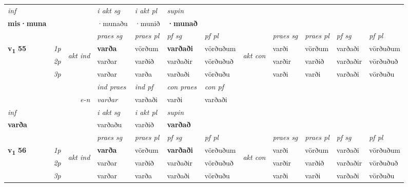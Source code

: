 \begin{longtable}[l]{X>{\footnotesize\itshape}llXXXXlXXXX}
   {\textit{inf}} & &  & \textit{i akt sg} & \textit{i akt pl}    & \textit{supin}   \\*
  {\textbf{mis\allowbreak ·muna}} & && ·munaðu  & ·munið    &  \textbf{·munað}   \\*

\midrule

 & &   & \textit{praes sg}  & \textit{praes pl}    & \textit{ pf sg} & \textit{pf pl} & & \textit{praes sg}  & \textit{praes pl}    & \textit{pf sg} & \textit{pf pl }  \\ \cmidrule{4-7} \cmidrule{9-12}
 \multirow{2}{*}{{{\textbf{v{\textsubscript{1}}} \Large{\textbf{55}}}}}  & 1p & \multirow{3}{*}{\begin{turn}{90}\textit{akt ind}\end{turn}} & \textbf{varða} & vörðum & \textbf{varðaði} & vörðuðum & \multirow{3}{*}{\begin{turn}{90}\textit{akt con}\end{turn}} &varði & vörðum & varðaði & vörðuðum\\*
 & 2p &  &  varðar  & varðið & varðaðir & vörðuðuð & & varðir & varðið & varðaðir & vörðuðuð \\*
 & 3p &  & varðar & varða & varðaði & vörðuðu & & varði & varði& varðaði & vörðuðu \\*
\cmidrule{4-7} \cmidrule{9-12}

   && &  \textit{ind praes} & \textit{ind pf} & \textit{con praes} & \textit{con pf} \\*
\multicolumn{3}{r}{\textit{e-n}} & varðar & varðaði & varði & varðaði \\*

\cmidrule{4-7}
   {\textit{inf}} & &  & \textit{i akt sg} & \textit{i akt pl}    & \textit{supin}   \\*
  {\textbf{varða}} & && varðaðu  & varðið    &  \textbf{varðað}   \\*

\midrule

 & &   & \textit{praes sg}  & \textit{praes pl}    & \textit{ pf sg} & \textit{pf pl} & & \textit{praes sg}  & \textit{praes pl}    & \textit{pf sg} & \textit{pf pl }  \\ \cmidrule{4-7} \cmidrule{9-12}
 \multirow{2}{*}{{{\textbf{v{\textsubscript{1}}} \Large{\textbf{56}}}}}  & 1p & \multirow{3}{*}{\begin{turn}{90}\textit{akt ind}\end{turn}} & \textbf{varða} & vörðum & \textbf{varðaði} & vörðuðum & \multirow{3}{*}{\begin{turn}{90}\textit{akt con}\end{turn}} &varði & vörðum & varðaði & vörðuðum\\*
 & 2p &  &  varðar  & varðið & varðaðir & vörðuðuð & & varðir & varðið & varðaðir & vörðuðuð \\*
 & 3p &  & varðar & varða & varðaði & vörðuðu & & varði & varði& varðaði & vörðuðu \\*
\cmidrule{4-7} \cmidrule{9-12}


\end{longtable}
